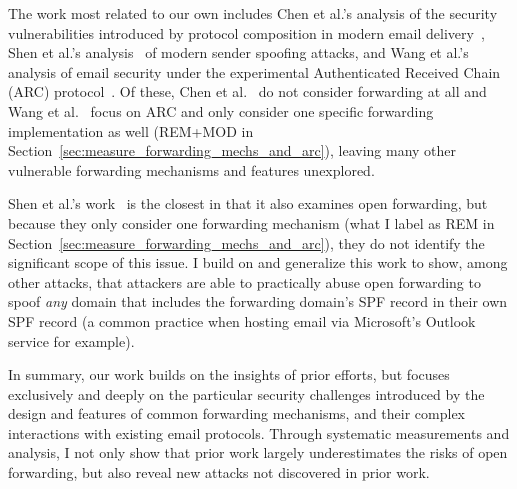 The work most related to our own includes Chen et al.'s analysis of
the security vulnerabilities introduced by protocol composition in
modern email delivery~\cite{chen2020composition}, Shen et al.'s
analysis~\cite{shen2020weak} of modern sender spoofing attacks, and Wang et al.'s~\cite{wang2022revisiting} analysis of email security under the experimental Authenticated Received Chain (ARC) protocol~\cite{rfc8617}.
Of these, Chen et al.~\cite{chen2020composition} do not consider forwarding at all and Wang et al.~\cite{wang2022revisiting} focus on ARC and only consider one specific forwarding implementation as well (REM+MOD in Section~\ref{sec:measure_forwarding_mechs_and_arc}), leaving many other vulnerable forwarding mechanisms and features unexplored.

Shen et al.'s work~\cite{shen2020weak} is the closest in that it also
examines open forwarding, but because they only consider one
forwarding mechanism (what I label as REM in
Section~\ref{sec:measure_forwarding_mechs_and_arc}), they do not
identify the significant scope of this issue.  I build on and
generalize this work to show, among other attacks, that attackers are
able to practically abuse open forwarding to spoof \emph{any} domain
that includes the forwarding domain's SPF record in their own SPF record (a
common practice when hosting email via Microsoft's Outlook service for example).



In summary, our work builds on the insights of prior efforts, but focuses exclusively and deeply on the particular security challenges introduced by the design and features of common forwarding mechanisms, and their complex interactions with existing email protocols. Through systematic measurements and analysis, I not only show that prior work largely underestimates the risks of open forwarding,
but also reveal new attacks not discovered in prior work.



